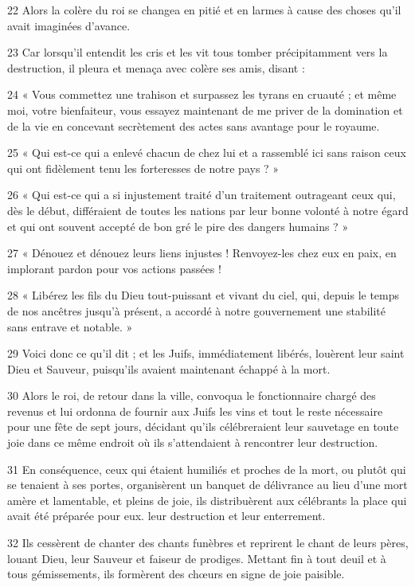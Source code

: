 \par 22 Alors la colère du roi se changea en pitié et en larmes à cause des choses qu'il avait imaginées d'avance.
\par 23 Car lorsqu'il entendit les cris et les vit tous tomber précipitamment vers la destruction, il pleura et menaça avec colère ses amis, disant :
\par 24 « Vous commettez une trahison et surpassez les tyrans en cruauté ; et même moi, votre bienfaiteur, vous essayez maintenant de me priver de la domination et de la vie en concevant secrètement des actes sans avantage pour le royaume.
\par 25 « Qui est-ce qui a enlevé chacun de chez lui et a rassemblé ici sans raison ceux qui ont fidèlement tenu les forteresses de notre pays ? »
\par 26 « Qui est-ce qui a si injustement traité d'un traitement outrageant ceux qui, dès le début, différaient de toutes les nations par leur bonne volonté à notre égard et qui ont souvent accepté de bon gré le pire des dangers humains ? »
\par 27 « Dénouez et dénouez leurs liens injustes ! Renvoyez-les chez eux en paix, en implorant pardon pour vos actions passées !
\par 28 « Libérez les fils du Dieu tout-puissant et vivant du ciel, qui, depuis le temps de nos ancêtres jusqu'à présent, a accordé à notre gouvernement une stabilité sans entrave et notable. »
\par 29 Voici donc ce qu'il dit ; et les Juifs, immédiatement libérés, louèrent leur saint Dieu et Sauveur, puisqu'ils avaient maintenant échappé à la mort.
\par 30 Alors le roi, de retour dans la ville, convoqua le fonctionnaire chargé des revenus et lui ordonna de fournir aux Juifs les vins et tout le reste nécessaire pour une fête de sept jours, décidant qu'ils célébreraient leur sauvetage en toute joie dans ce même endroit où ils s'attendaient à rencontrer leur destruction.
\par 31 En conséquence, ceux qui étaient humiliés et proches de la mort, ou plutôt qui se tenaient à ses portes, organisèrent un banquet de délivrance au lieu d'une mort amère et lamentable, et pleins de joie, ils distribuèrent aux célébrants la place qui avait été préparée pour eux. leur destruction et leur enterrement.
\par 32 Ils cessèrent de chanter des chants funèbres et reprirent le chant de leurs pères, louant Dieu, leur Sauveur et faiseur de prodiges. Mettant fin à tout deuil et à tous gémissements, ils formèrent des chœurs en signe de joie paisible.
